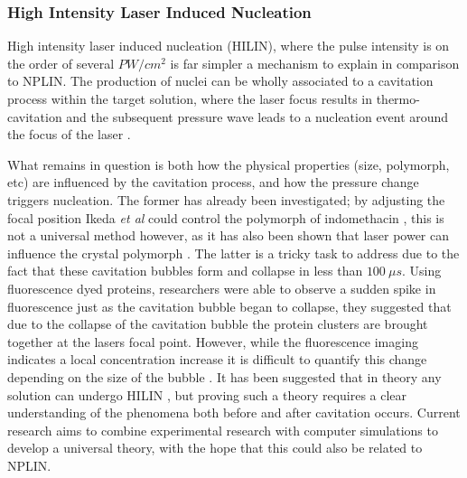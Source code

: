 \subsubsection{High Intensity Laser Induced Nucleation}
High intensity laser induced nucleation (HILIN), where the pulse 
intensity is on the order of several $PW/cm^2$ is far simpler a 
mechanism to explain in comparison to NPLIN. The production of 
nuclei can be wholly associated to a cavitation process within 
the target solution, where the laser focus results in thermo-
cavitation and the subsequent pressure wave leads to a nucleation 
event around the focus of the laser \cite{Yoshikawa2005, Soare2011, 
Barber2019}. 

What remains in question is both how the physical properties (size, 
polymorph, etc) are influenced by the cavitation process, and how 
the pressure change triggers nucleation. The former has already 
been investigated; by adjusting the focal position Ikeda \textit{et 
al} could control the polymorph of indomethacin \cite{Ikeda2015}, 
this is not a universal method however, as it has also been shown 
that laser power can influence the crystal polymorph \cite{Wang2010}. 
The latter is a tricky task to address due to the fact that these 
cavitation bubbles form and collapse in less than $100\ \mu s$. 
Using fluorescence dyed proteins, researchers were able to observe 
a sudden spike in fluorescence just as the cavitation bubble began 
to collapse, they suggested that due to the collapse of the cavitation 
bubble the protein clusters are brought together at the lasers focal 
point. However, while the fluorescence imaging indicates a local 
concentration increase it is difficult to quantify this change 
depending on the size of the bubble \cite{Korede2023}. It has been 
suggested that in theory any solution can undergo HILIN 
\cite{Korede2023}, but proving such a theory requires a clear 
understanding of the phenomena both before and after cavitation occurs. 
Current research aims to combine experimental research with computer 
simulations to develop a universal theory, with the hope that this 
could also be related to NPLIN.   

